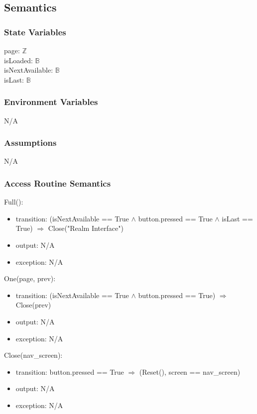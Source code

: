 \documentclass[12pt, titlepage]{article}
\begin{document}
\subsection{Semantics}

\subsubsection{State Variables}

page: $\mathbb{Z}$\\
isLoaded: $\mathbb{B}$\\
isNextAvailable: $\mathbb{B}$\\
isLast: $\mathbb{B}$

\subsubsection{Environment Variables}

N/A

\subsubsection{Assumptions}

N/A

\subsubsection{Access Routine Semantics}

\noindent Full():
\begin{itemize}
\item transition: (isNextAvailable == True $\wedge$ button.pressed == True $\wedge$ isLast == True) $\Rightarrow$ Close("Realm Interface")
\item output: N/A
\item exception: N/A
\end{itemize}

\noindent One(page, prev):
\begin{itemize}
\item transition: (isNextAvailable == True $\wedge$ button.pressed == True) $\Rightarrow$ Close(prev)
\item output: N/A
\item exception: N/A
\end{itemize}

\noindent Close(nav\_screen):
\begin{itemize}
\item transition: button.pressed == True $\Rightarrow$ (Reset(), screen == nav\_screen)
\item output: N/A
\item exception: N/A
\end{itemize}
\end{document}

